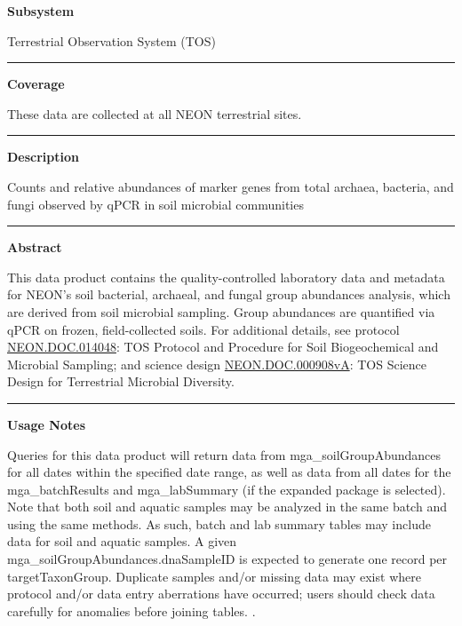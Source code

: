 \documentclass[]{article}
\begin{document}
\textbf{Subsystem}

Terrestrial Observation System (TOS)

\begin{center}\rule{0.5\linewidth}{\linethickness}\end{center}

\textbf{Coverage}

These data are collected at all NEON terrestrial sites.

\begin{center}\rule{0.5\linewidth}{\linethickness}\end{center}

\textbf{Description}

Counts and relative abundances of marker genes from total archaea,
bacteria, and fungi observed by qPCR in soil microbial communities

\begin{center}\rule{0.5\linewidth}{\linethickness}\end{center}

\textbf{Abstract}

This data product contains the quality-controlled laboratory data and
metadata for NEON's soil bacterial, archaeal, and fungal group
abundances analysis, which are derived from soil microbial sampling.
Group abundances are quantified via qPCR on frozen, field-collected
soils. For additional details, see protocol
\href{http://data.neonscience.org/api/v0/documents/NEON.DOC.014048vJ}{NEON.DOC.014048}:
TOS Protocol and Procedure for Soil Biogeochemical and Microbial
Sampling; and science design
\href{http://data.neonscience.org/api/v0/documents/NEON.DOC.000908vA}{NEON.DOC.000908vA}:
TOS Science Design for Terrestrial Microbial Diversity.

\begin{center}\rule{0.5\linewidth}{\linethickness}\end{center}

\textbf{Usage Notes}

Queries for this data product will return data from
mga\_soilGroupAbundances for all dates within the specified date range,
as well as data from all dates for the mga\_batchResults and
mga\_labSummary (if the expanded package is selected). Note that both
soil and aquatic samples may be analyzed in the same batch and using the
same methods. As such, batch and lab summary tables may include data for
soil and aquatic samples. A given mga\_soilGroupAbundances.dnaSampleID
is expected to generate one record per targetTaxonGroup. Duplicate
samples and/or missing data may exist where protocol and/or data entry
aberrations have occurred; users should check data carefully for
anomalies before joining tables. \newpage
.
\end{document}
